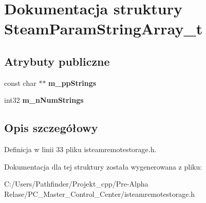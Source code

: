 \hypertarget{struct_steam_param_string_array__t}{}\section{Dokumentacja struktury Steam\+Param\+String\+Array\+\_\+t}
\label{struct_steam_param_string_array__t}
\subsection*{Atrybuty publiczne}
\begin{DoxyCompactItemize}
\item 
\mbox{\label{struct_steam_param_string_array__t_a903246c59099118e6b1dc1468973190a}} 
const char $\ast$$\ast$ {\bfseries m\+\_\+pp\+Strings}
\item 
\mbox{\label{struct_steam_param_string_array__t_a77491c6860983c576e2018e8336b0923}} 
int32 {\bfseries m\+\_\+n\+Num\+Strings}
\end{DoxyCompactItemize}


\subsection{Opis szczegółowy}


Definicja w linii 33 pliku isteamremotestorage.\+h.



Dokumentacja dla tej struktury została wygenerowana z pliku\+:\begin{DoxyCompactItemize}
\item 
C\+:/\+Users/\+Pathfinder/\+Projekt\+\_\+cpp/\+Pre-\/\+Alpha Relase/\+P\+C\+\_\+\+Master\+\_\+\+Control\+\_\+\+Center/isteamremotestorage.\+h\end{DoxyCompactItemize}
